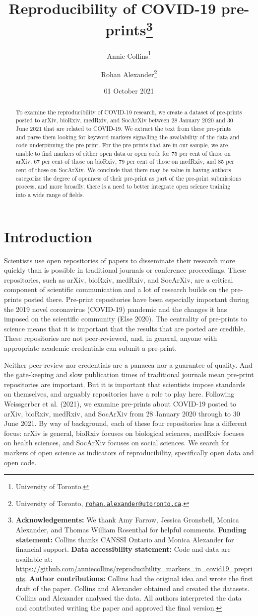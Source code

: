 \documentclass[
]{article}
\title{Reproducibility of COVID-19 pre-prints\thanks{\textbf{Acknowledgements:} We thank Amy Farrow, Jessica Gronsbell, Monica Alexander, and Thomas William Rosenthal for helpful comments. \textbf{Funding statement:} Collins thanks CANSSI Ontario and Monica Alexander for financial support. \textbf{Data accessibility statement:} Code and data are available at: \url{https://github.com/anniecollins/reproducibility_markers_in_covid19_preprints}. \textbf{Author contributions:} Collins had the original idea and wrote the first draft of the paper. Collins and Alexander obtained and created the datasets. Collins and Alexander analysed the data. All authors interpreted the data and contributed writing the paper and approved the final version.}}
\author{Annie Collins\footnote{University of Toronto.} \and Rohan Alexander\footnote{University of Toronto, \href{mailto:rohan.alexander@utoronto.ca}{\nolinkurl{rohan.alexander@utoronto.ca}}.}}
\date{01 October 2021}
\begin{document}
\maketitle
\begin{abstract}
To examine the reproducibility of COVID-19 research, we create a dataset of pre-prints posted to arXiv, bioRxiv, medRxiv, and SocArXiv between 28 January 2020 and 30 June 2021 that are related to COVID-19. We extract the text from these pre-prints and parse them looking for keyword markers signalling the availability of the data and code underpinning the pre-print. For the pre-prints that are in our sample, we are unable to find markers of either open data or open code for 75 per cent of those on arXiv, 67 per cent of those on bioRxiv, 79 per cent of those on medRxiv, and 85 per cent of those on SocArXiv. We conclude that there may be value in having authors categorize the degree of openness of their pre-print as part of the pre-print submissions process, and more broadly, there is a need to better integrate open science training into a wide range of fields.
\end{abstract}

\hypertarget{introduction}{%
\section{Introduction}\label{introduction}}

Scientists use open repositories of papers to disseminate their research more quickly than is possible in traditional journals or conference proceedings. These repositories, such as arXiv, bioRxiv, medRxiv, and SocArXiv, are a critical component of scientific communication and a lot of research builds on the pre-prints posted there. Pre-print repositories have been especially important during the 2019 novel coronavirus (COVID-19) pandemic and the changes it has imposed on the scientific community (Else 2020). The centrality of pre-prints to science means that it is important that the results that are posted are credible. These repositories are not peer-reviewed, and, in general, anyone with appropriate academic credentials can submit a pre-print.

Neither peer-review nor credentials are a panacea nor a guarantee of quality. And the gate-keeping and slow publication times of traditional journals mean pre-print repositories are important. But it is important that scientists impose standards on themselves, and arguably repositories have a role to play here. Following Weissgerber et al. (2021), we examine pre-prints about COVID-19 posted to arXiv, bioRxiv, medRxiv, and SocArXiv from 28 January 2020 through to 30 June 2021. By way of background, each of these four repositories has a different focus: arXiv is general, bioRxiv focuses on biological sciences, medRxiv focuses on health sciences, and SocArXiv focuses on social sciences. We search for markers of open science as indicators of reproducibility, specifically open data and open code.
\end{document}
